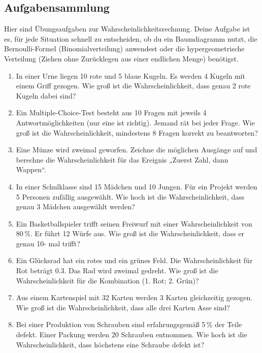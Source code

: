 \subsection*{Aufgabensammlung}

Hier sind Übungsaufgaben zur Wahrscheinlichkeitsrechnung. Deine Aufgabe ist
es, für jede Situation schnell zu entscheiden, ob du ein Baumdiagramm nutzt, die
Bernoulli-Formel (Binomialverteilung) anwendest oder die hypergeometrische
Verteilung (Ziehen ohne Zurücklegen aus einer endlichen Menge) benötigst.
\begin{enumerate}
\item
  In einer Urne liegen 10 rote und 5 blaue Kugeln. Es werden 4 Kugeln mit einem
Griff gezogen. Wie groß ist die Wahrscheinlichkeit, dass genau 2 rote Kugeln
dabei sind?
\item
  Ein Multiple-Choice-Test besteht aus 10 Fragen mit jeweils 4
Antwortmöglichkeiten (nur eine ist richtig). Jemand rät bei jeder Frage. Wie
groß ist die Wahrscheinlichkeit, mindestens 8 Fragen korrekt zu beantworten? 
\item
  Eine Münze wird zweimal geworfen. Zeichne die möglichen Ausgänge auf und
berechne die Wahrscheinlichkeit für das Ereignis „Zuerst Zahl, dann Wappen“.
\item
  In einer Schulklasse sind 15 Mädchen und 10 Jungen. Für ein Projekt werden 5
Personen zufällig ausgewählt. Wie hoch ist die Wahrscheinlichkeit, dass genau
3 Mädchen ausgewählt werden?
\item
  Ein Basketballspieler trifft seinen Freiwurf mit einer Wahrscheinlichkeit von 80\,\%. Er führt 12 Würfe aus. Wie groß ist die Wahrscheinlichkeit, dass er genau 10-
mal trifft?
\item
  Ein Glücksrad hat ein rotes und ein grünes Feld. Die Wahrscheinlichkeit für Rot
beträgt 0.3. Das Rad wird zweimal gedreht. Wie groß ist die Wahrscheinlichkeit
für die Kombination (1. Rot; 2. Grün)? 
\item
  Aus einem Kartenspiel mit 32 Karten werden 3 Karten gleichzeitig gezogen.
Wie groß ist die Wahrscheinlichkeit, dass alle drei Karten Asse sind?
\item
  Bei einer Produktion von Schrauben sind erfahrungsgemäß 5\,\% der Teile
defekt. Einer Packung werden 20 Schrauben entnommen. Wie hoch ist die
Wahrscheinlichkeit, dass höchstens eine Schraube defekt ist?

\end{enumerate}
